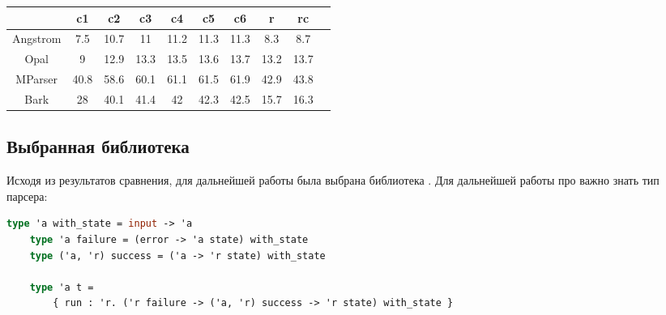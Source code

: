 \noindent
\begin{center}
    \begin{tabular}{|c|c|c|c|c|c|c|c|c|c|}
        \hline
                        & c1   & c2   & c3   & c4   & c5   & c6   & r    & rc    \\\hline
        Angstrom        & 7.5  & 10.7 & 11   & 11.2 & 11.3 & 11.3 & 8.3  & 8.7   \\
        Opal            & 9    & 12.9 & 13.3 & 13.5 & 13.6 & 13.7 & 13.2 & 13.7  \\
        MParser         & 40.8 & 58.6 & 60.1 & 61.1 & 61.5 & 61.9 & 42.9 & 43.8  \\
        Bark            & 28   & 40.1 & 41.4 & 42   & 42.3 & 42.5 & 15.7 & 16.3  \\\hline
    \end{tabular}
\end{center}

\subsection{Выбранная библиотека}

Исходя из результатов сравнения, для дальнейшей работы была выбрана библиотека \angstrom{}.
Для дальнейшей работы про \angstrom{} важно знать тип парсера:

\begin{lstlisting}[escapechar=!,language=ocaml]
    type 'a with_state = input -> 'a
    type 'a failure = (error -> 'a state) with_state
    type ('a, 'r) success = ('a -> 'r state) with_state

    type 'a t =
        { run : 'r. ('r failure -> ('a, 'r) success -> 'r state) with_state }
\end{lstlisting}
